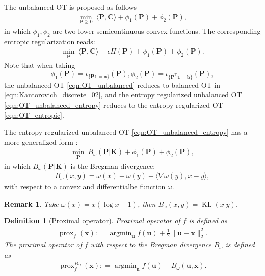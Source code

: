 \documentclass[11pt]{book}
\newtheorem{definition}[theorem]{Definition}
\newtheorem{remark}[theorem]{Remark}
\begin{document}
The unbalanced OT is proposed as follows \cite{chizat2017unbalanced}
\begin{align}\label{eqn:OT_unbalanced}
    \min_{\mathbf{P}\ge0} \ \langle \mathbf{P}, \mathbf{C} \rangle + \phi_1(\mathbf{P}) + \phi_2(\mathbf{P}),
\end{align}
in which $\phi_1, \phi_2$ are two lower-semicontinuous convex functions. The corresponding entropic regularization reads:
\begin{align}\label{eqn:OT_unbalanced_entropy}
    \min_{\mathbf{P}} \ \langle \mathbf{P}, \mathbf{C}  \rangle - \epsilon H(\mathbf{P}) + \phi_1(\mathbf{P}) + \phi_2(\mathbf{P}).
\end{align}
Note that when taking 
\[
\phi_1(\mathbf{P}) = \iota_{\{\mathbf{P}\mathbb{1}=\mathbf{a}\}}(\mathbf{P}), \phi_2(\mathbf{P}) = \iota_{\{\mathbf{P}^{\mathrm{T}}\mathbb{1}=\mathbf{b}\}}(\mathbf{P}),
\]
the unbalanced OT \eqref{eqn:OT_unbalanced} reduces to balanced OT in \eqref{eqn:Kantorovich_discrete_02}, and the entropy regularized unbalanced OT \eqref{eqn:OT_unbalanced_entropy} reduces to the entropy regularized OT \eqref{eqn:OT_entropic}.

The entropy regularized unbalanced OT \eqref{eqn:OT_unbalanced_entropy} has a more generalized form \cite{peyre2015entropic}:
\begin{align}\label{eqn:OT_unbalanced_entropy02}
    \min_{\mathbf{P}} \ B_{\omega}(\mathbf{P}|\mathbf{K}) + \phi_1(\mathbf{P}) + \phi_2(\mathbf{P}),
\end{align}
in which $B_{\omega}(\mathbf{P}|\mathbf{K})$ is the Bregman divergence:
\begin{align}
    B_{\omega}(x,y) = \omega(x) - \omega(y) - \langle \nabla \omega (y), x - y \rangle,
\end{align}
with respect to a convex and differentialbe function $\omega$.

\begin{remark}
    Take $\omega(x) = x(\log x -1)$, then $B_{\omega}(x,y) = \operatorname{KL}(x|y)$.
\end{remark}

\begin{definition}[Proximal operator]
    Proximal operator of $f$ is defined as
    \begin{align}
        \operatorname{prox}_f(\mathbf{x}): = \operatorname{argmin}_\mathbf{u} f(\mathbf{u}) + \frac{1}{2}\|\mathbf{u}-\mathbf{x}\|_2^2.
    \end{align}
    The proximal operator of $f$ with respect to the Bregman divergence $B_{\omega}$ is defined as 
    \begin{align}
        \operatorname{prox}^{B_{\omega}}_f(\mathbf{x}): = \operatorname{argmin}_\mathbf{u} f(\mathbf{u}) + B_{\omega}(\mathbf{u},\mathbf{x}).
    \end{align}
\end{definition}
\end{document}
